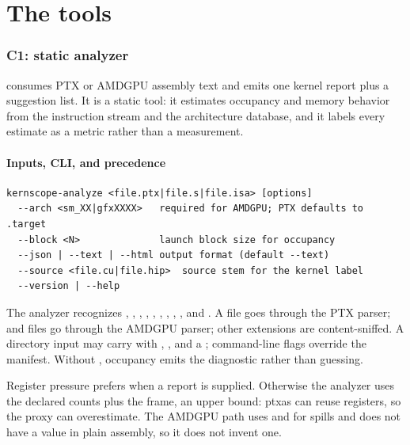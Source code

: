 \clearpage
\floraon
{}
\part{The tools}
\thispagestyle{empty}
\clearpage
\floraoff

\section{C1: static analyzer}
\label{sec:c1}

 consumes PTX or AMDGPU assembly text and emits one
kernel report plus a suggestion list. It is a static tool: it estimates
occupancy and memory behavior from the instruction stream and the architecture
database, and it labels every estimate as a metric rather than a measurement.

\subsection{Inputs, CLI, and precedence}
\label{sec:c1-cli}

\begin{lstlisting}
kernscope-analyze <file.ptx|file.s|file.isa> [options]
  --arch <sm_XX|gfxXXXX>   required for AMDGPU; PTX defaults to .target
  --block <N>              launch block size for occupancy
  --json | --text | --html output format (default --text)
  --source <file.cu|file.hip>  source stem for the kernel label
  --version | --help
\end{lstlisting}

The analyzer recognizes , , , ,
, , , , , and
. A  file goes through the PTX parser;  and
 files go through the AMDGPU parser; other extensions are
content-sniffed. A directory input may carry  with
, , and a ; command-line flags
override the manifest. Without , occupancy emits the
 diagnostic rather than guessing.

Register pressure prefers  when a report is supplied. Otherwise
the analyzer uses the declared  counts plus the  frame,
an upper bound: ptxas can reuse registers, so the proxy can overestimate.
The AMDGPU path uses  and  for spills and
does not have a  value in plain assembly, so it does not
invent one.

